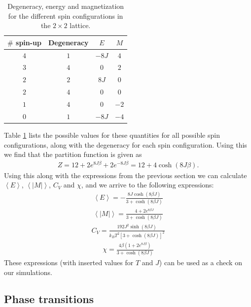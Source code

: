 \documentclass[12pt, a4paper]{article}
\begin{document}
\begin{table}[H]
\caption{Degeneracy, energy and magnetization for the different spin configurations in the $2\times 2$
lattice.}
\label{tab:2times2}
\begin{center}
\begin{tabular}{cccc} \hline\hline
$\#$ spin-up & Degeneracy & $E$ & $M$ \\ \hline
$4$ & $1$ & $-8J$ & $4$ \\ 
$3$ & $4$ & $0$ & $2$ \\
$2$ & $2$ & $8J$ & $0$ \\  
$2$ & $4$ & $0$ & $0$ \\ 
$1$ & $4$ & $0$ & $-2$ \\ 
$0$ & $1$ & $-8J$ & $-4$ \\ \hline
\end{tabular}
\end{center}
\end{table}

Table \ref{tab:2times2} lists the possible values for these quantities for all possible spin 
configurations, along with the degeneracy for each spin configuration. Using this we find that the 
partition function is given as 
\begin{align*}
Z = 12 + 2e^{8J\beta} + 2e^{-8J\beta} = 12 + 4 \cosh(8J\beta). 
\end{align*} 
Using this along with the expressions from the previous section we can calculate 
$\left\langle E \right\rangle$, $\left\langle |M| \right\rangle$, $C_V$ and $\chi$, and we arrive 
to the following expressions:  
\begin{align*}
\left\langle E \right\rangle = -\frac{8J\cosh (8\beta J)}{3 + \cosh (8\beta J)}  
\end{align*}  
\begin{align*}
\left\langle |M| \right\rangle = \frac{4+2 e^{8\beta J}}{3 + \cosh (8\beta J)}  
\end{align*} 
\begin{align*}
C_V = \frac{192J^2\sinh (8\beta J)}{k_BT^2\left[ 3 + \cosh (8\beta J)\right]^2}  
\end{align*} 
\begin{align*}
\chi = \frac{4\beta\left( 1 + 2e^{8J\beta} \right)}{3 + \cosh (8\beta J)}
\end{align*}
These expressions (with inserted values for $T$ and $J$) can be used as a check on our simulations.   

\subsection{Phase transitions}
\end{document}
